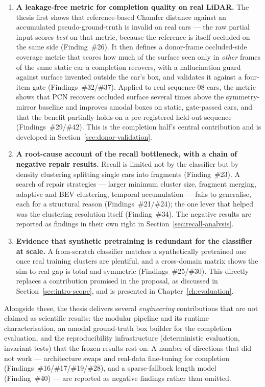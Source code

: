 \begin{enumerate}
  \item \textbf{A leakage-free metric for completion quality on real LiDAR.} The
    thesis first shows that reference-based Chamfer distance against an accumulated
    pseudo-ground-truth is invalid on real cars --- the raw partial input scores
    \emph{best} on that metric, because the reference is itself occluded on the same
    side (Finding~\#26). It then defines a donor-frame occluded-side coverage
    metric that scores how much of the surface seen only in \emph{other} frames of
    the same static car a completion recovers, with a hallucination guard against
    surface invented outside the car's box, and validates it against a four-item
    gate (Findings~\#32/\#37). Applied to real sequence-08 cars, the metric shows
    that PCN recovers occluded surface several times above the symmetry-mirror
    baseline and improves amodal boxes on static, gate-passed cars, and that the
    benefit partially holds on a pre-registered held-out sequence
    (Findings~\#29/\#42). This is the completion half's central contribution and is
    developed in Section~\ref{sec:donor-validation}.
  \item \textbf{A root-cause account of the recall bottleneck, with a chain of
    negative repair results.} Recall is limited not by the classifier but by
    density clustering splitting single cars into fragments (Finding~\#23). A
    search of repair strategies --- larger minimum cluster size, fragment merging,
    adaptive and BEV clustering, temporal accumulation --- fails to generalise,
    each for a structural reason (Findings~\#21/\#24); the one lever that helped
    was the clustering resolution itself (Finding~\#34). The negative results are reported as findings in their
    own right in Section~\ref{sec:recall-analysis}.
  \item \textbf{Evidence that synthetic pretraining is redundant for the classifier
    at scale.} A from-scratch classifier matches a synthetically pretrained one once
    real training clusters are plentiful, and a cross-domain matrix shows the
    sim-to-real gap is total and symmetric (Findings~\#25/\#30). This directly
    replaces a contribution promised in the proposal, as discussed in
    Section~\ref{sec:intro-scope}, and is presented in Chapter~\ref{ch:evaluation}.
\end{enumerate}

Alongside these, the thesis delivers several \emph{engineering} contributions that
are not claimed as scientific results: the modular pipeline and its runtime
characterisation, an amodal ground-truth box builder for the completion evaluation,
and the reproducibility infrastructure (deterministic evaluation, invariant tests)
that the frozen results rest on. A number of directions that did not work ---
architecture swaps and real-data fine-tuning for completion (Findings~\#16/\#17/\#19/\#28),
and a sparse-fallback length model (Finding~\#40) --- are reported as negative
findings rather than omitted.

